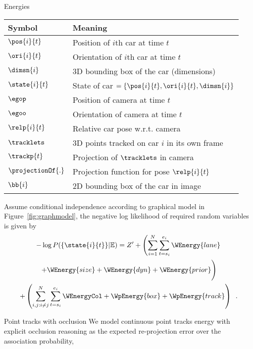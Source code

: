 \documentclass[final]{beamer}
\newlength{\onecolwid}
\begin{document}
\begin{frame}[t]
\begin{columns}[t]
\begin{column}{\onecolwid}
      \begin{block}{Energies}
        \begin{table}[h]
          \begin{tabular}{|l|l|}
            \hline
            Symbol & Meaning \\
            \hline
            $\pos{i}{t}$ & Position of $i$th car at time $t$\\
            $\ori{i}{t}$ & Orientation of $i$th car at time $t$\\
            $\dimsn{i}$ & 3D bounding box of the car (dimensions)\\
            $\state{i}{t}$ & State of car $=\{\pos{i}{t}, \ori{i}{t}, \dimsn{i}\}$\\
            $\egop$ & Position of camera at time $t$\\
            $\egoo$ & Orientation of camera at time $t$\\
            $\relp{i}{t}$ & Relative car pose w.r.t. camera \\
            $\tracklets$ & 3D points tracked on car $i$ in its own frame\\
            $\trackp{t}$ & Projection of $\tracklets$ in camera\\
            $\projectionOf{.}$ & Projection function for pose $\relp{i}{t}$\\
            $\bb{i}$ & 2D bounding box of the car in image\\
            \hline
          \end{tabular}
        \end{table}

        Assume conditional independence according to graphical model in
        Figure~\ref{fig:graphmodel}, the negative log likelihood of required
        random variables is given by
        \begin{multline}
          -\log{P(\{\state{i}{t}\} | \mathbb{E})} = 
          Z' + 
          \left(
            \sum_{i=1}^N \sum_{t=s_i}^{e_i}
            \WEnergy{lane} \right.\\
            \left.
            + \WEnergy{size}
            + \WEnergy{dyn}
            + \WEnergy{prior}
            \vphantom{ \sum_{i=1}^N \sum_{t=s_i}^{e_i} }
          \right)\\
          +
          \left(
            \sum_{i,j:i\ne j}^N \sum_{t=s_i}^{e_i}  \WEnergyCol
            + \WpEnergy{box}
            + \WpEnergy{track}
          \right)
          \enspace.
        \end{multline}
      \end{block}
      \begin{block}{Point tracks with occlusion}
        We model continuous point tracks energy with explicit occlusion reasoning as
        the expected re-projection error over the association probability,


\end{block}
\end{column}
\end{columns}
\end{frame}
\end{document}
